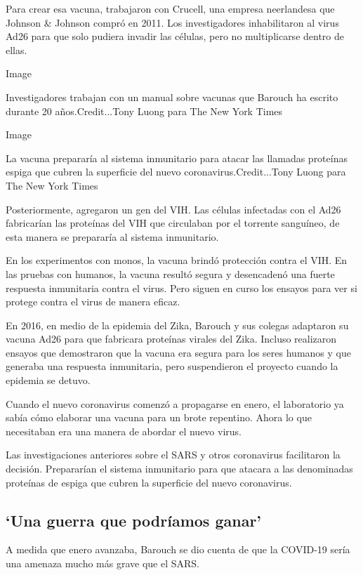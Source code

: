 Para crear esa vacuna, trabajaron con Crucell, una empresa neerlandesa
que Johnson \& Johnson compró en 2011. Los investigadores inhabilitaron
al virus Ad26 para que solo pudiera invadir las células, pero no
multiplicarse dentro de ellas.

Image

Investigadores trabajan con un manual sobre vacunas que Barouch ha
escrito durante 20 años.Credit...Tony Luong para The New York Times

Image

La vacuna prepararía al sistema inmunitario para atacar las llamadas
proteínas espiga que cubren la superficie del nuevo
coronavirus.Credit...Tony Luong para The New York Times

Posteriormente, agregaron un gen del VIH. Las células infectadas con el
Ad26 fabricarían las proteínas del VIH que circulaban por el torrente
sanguíneo, de esta manera se prepararía al sistema inmunitario.

En los experimentos con monos, la vacuna brindó protección contra el
VIH. En las pruebas con humanos, la vacuna resultó segura y desencadenó
una fuerte respuesta inmunitaria contra el virus. Pero siguen en curso
los ensayos para ver si protege contra el virus de manera eficaz.

En 2016, en medio de la epidemia del Zika, Barouch y sus colegas
adaptaron su vacuna Ad26 para que fabricara proteínas virales del Zika.
Incluso realizaron ensayos que demostraron que la vacuna era segura para
los seres humanos y que generaba una respuesta inmunitaria, pero
suspendieron el proyecto cuando la epidemia se detuvo.

Cuando el nuevo coronavirus comenzó a propagarse en enero, el
laboratorio ya sabía cómo elaborar una vacuna para un brote repentino.
Ahora lo que necesitaban era una manera de abordar el nuevo virus.

Las investigaciones anteriores sobre el SARS y otros coronavirus
facilitaron la decisión. Prepararían el sistema inmunitario para que
atacara a las denominadas proteínas de espiga que cubren la superficie
del nuevo coronavirus.

\hypertarget{una-guerra-que-podruxedamos-ganar}{%
\subsection{`Una guerra que podríamos
ganar'}\label{una-guerra-que-podruxedamos-ganar}}

A medida que enero avanzaba, Barouch se dio cuenta de que la COVID-19
sería una amenaza mucho más grave que el SARS.

